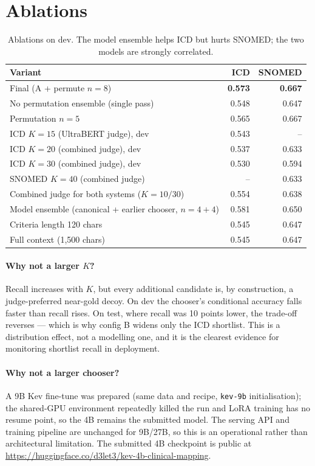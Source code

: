 \documentclass[11pt]{article}
\newcommand{\code}[1]{\texttt{#1}}
\begin{document}
\section{Ablations}
\begin{table}[H]
\centering
\small
\begin{tabularx}{\linewidth}{@{}Xrr@{}}
\toprule
Variant & ICD & SNOMED\\
\midrule
Final (A + permute $n{=}8$) & \textbf{0.573} & \textbf{0.667}\\
No permutation ensemble (single pass) & 0.548 & 0.647\\
Permutation $n{=}5$ & 0.565 & 0.667\\
ICD $K{=}15$ (UltraBERT judge), dev & 0.543 & --\\
ICD $K{=}20$ (combined judge), dev & 0.537 & 0.633\\
ICD $K{=}30$ (combined judge), dev & 0.530 & 0.594\\
SNOMED $K{=}40$ (combined judge) & -- & 0.633\\
Combined judge for both systems ($K{=}10/30$) & 0.554 & 0.638\\
Model ensemble (canonical + earlier chooser, $n{=}4{+}4$) & 0.581 & 0.650\\
Criteria length 120 chars & 0.545 & 0.647\\
Full context (1{,}500 chars) & 0.545 & 0.647\\
\bottomrule
\end{tabularx}
\caption{Ablations on dev. The model ensemble helps ICD but hurts SNOMED; the
two models are strongly correlated.}
\end{table}

\paragraph{Why not a larger $K$?}
Recall increases with $K$, but every additional candidate is, by construction, a
judge-preferred near-gold decoy. On dev the chooser's conditional accuracy falls faster than
recall rises. On test, where recall was 10 points lower, the trade-off reverses --- which is
why config B widens only the ICD shortlist. This is a distribution effect, not a modelling
one, and it is the clearest evidence for monitoring shortlist recall in deployment.

\paragraph{Why not a larger chooser?}
A 9B Kev fine-tune was prepared (same data and recipe, \code{kev-9b} initialisation); the
shared-GPU environment repeatedly killed the run and LoRA training has no resume point, so
the 4B remains the submitted model. The serving API and training pipeline are unchanged for
9B/27B, so this is an operational rather than architectural limitation.
The submitted 4B checkpoint is public at
\url{https://huggingface.co/d3let3/kev-4b-clinical-mapping}.
\end{document}
